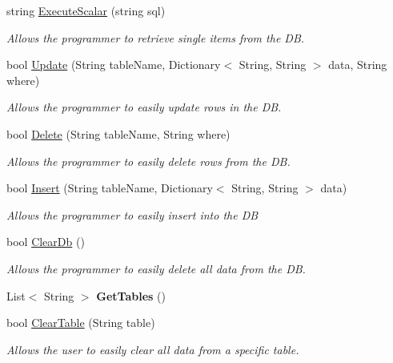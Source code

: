 \begin{DoxyCompactItemize}
string \hyperlink{class_s_q_lite_database_a330f9baa1179004fbe7bdd5a3cc2930d}{Execute\-Scalar} (string sql)
\begin{DoxyCompactList}\small\item\em Allows the programmer to retrieve single items from the D\-B. \end{DoxyCompactList}\item 
bool \hyperlink{class_s_q_lite_database_a0458d1ad962e59b6602f3b58c600fb8e}{Update} (String table\-Name, Dictionary$<$ String, String $>$ data, String where)
\begin{DoxyCompactList}\small\item\em Allows the programmer to easily update rows in the D\-B. \end{DoxyCompactList}\item 
bool \hyperlink{class_s_q_lite_database_a9cbab6bb03bdd2529dd0154de5261459}{Delete} (String table\-Name, String where)
\begin{DoxyCompactList}\small\item\em Allows the programmer to easily delete rows from the D\-B. \end{DoxyCompactList}\item 
bool \hyperlink{class_s_q_lite_database_afb8919879352e752ef7e8d6f99bc5882}{Insert} (String table\-Name, Dictionary$<$ String, String $>$ data)
\begin{DoxyCompactList}\small\item\em Allows the programmer to easily insert into the D\-B \end{DoxyCompactList}\item 
bool \hyperlink{class_s_q_lite_database_ae811507c54b5fc385997042205a15aff}{Clear\-Db} ()
\begin{DoxyCompactList}\small\item\em Allows the programmer to easily delete all data from the D\-B. \end{DoxyCompactList}\item 
\hypertarget{class_s_q_lite_database_ab5c314197d8e3f28ffcd45ffb22fc39d}{List$<$ String $>$ {\bfseries Get\-Tables} ()}\label{class_s_q_lite_database_ab5c314197d8e3f28ffcd45ffb22fc39d}

\item 
bool \hyperlink{class_s_q_lite_database_a0afb4ab2317c329ae68a3c7da59329ee}{Clear\-Table} (String table)
\begin{DoxyCompactList}\small\item\em Allows the user to easily clear all data from a specific table. \end{DoxyCompactList}\end{DoxyCompactItemize}


